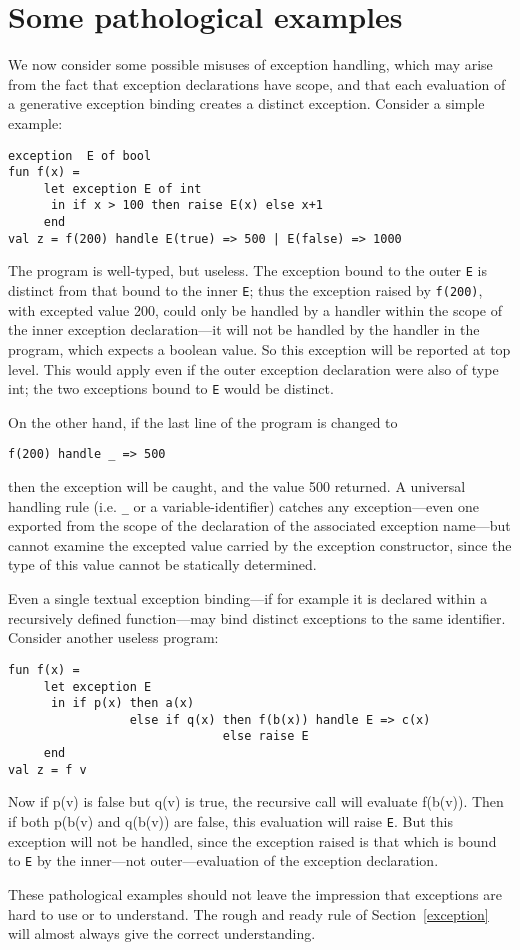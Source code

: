 \section{Some pathological examples}
\label{pathexn}
We now consider some possible misuses of exception handling, which
may arise from the fact that exception declarations have scope, and
that each evaluation of a generative exception binding creates a
distinct exception.  Consider a simple example:
\begin{verbatim}
exception  E of bool
fun f(x) = 
     let exception E of int
      in if x > 100 then raise E(x) else x+1
     end
val z = f(200) handle E(true) => 500 | E(false) => 1000
\end{verbatim}
The program is  well-typed, but useless.  The exception bound to the
outer \verb"E" is distinct from that bound to the inner \verb"E";
thus the exception raised by \verb"f(200)", with excepted value 200,
could only be handled by a handler within the scope of the inner
exception declaration---it will not be handled by the handler in the
program, which expects a boolean value.  So this exception will be
reported at top level.  This would apply even if the outer exception
declaration were also of type int; the two exceptions bound to
\verb"E" would be distinct.

On the other hand, if the last line of the program is changed to
\begin{verbatim}
f(200) handle _ => 500
\end{verbatim}
then the exception will be caught, and the value 500 returned.  A
universal handling rule (i.e. \verb"_" or a variable-identifier)
catches any exception---even one exported from the scope of the
declaration of the associated exception name---but cannot examine the
excepted value carried by the exception constructor, since the type
of this value cannot be statically determined.

Even a single textual exception binding---if for example it is
declared within a recursively defined function---may bind distinct
exceptions to the same identifier.  Consider another useless program:
\begin{verbatim}
fun f(x) =
     let exception E
      in if p(x) then a(x)
                 else if q(x) then f(b(x)) handle E => c(x)
                              else raise E
     end
val z = f v
\end{verbatim}
Now if p(v) is false but q(v) is true, the recursive call will
evaluate f(b(v)).  Then if both p(b(v) and q(b(v)) are false, this
evaluation will raise \verb"E".  But this exception will not be
handled, since the exception raised is that which is bound to
\verb"E" by the inner---not outer---evaluation of the exception
declaration.

These pathological examples should not leave the impression that
exceptions are hard to use or to understand.  The rough and ready
rule of Section~\ref{exception} will almost always  give the correct
understanding.
